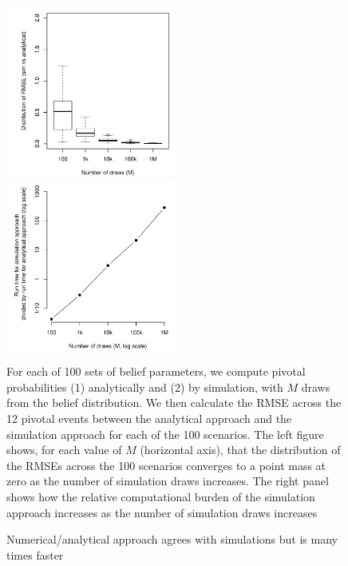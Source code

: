 \documentclass[11pt,a4paper]{article}
\begin{document}
\begin{figure}\caption{Numerical/analytical approach agrees with simulations but is many times faster \label{rmse_box}}
\begin{center}
\includegraphics[width=0.5\textwidth]{./../../output/figs/rmses/rmse_boxplots_by_number_of_simulations_no_trunc_dirichlet_v2_narrower.pdf}%
\includegraphics[width=0.5\textwidth]{./../../output/figs/rmses/time_required.pdf}
\end{center} 
\footnotesize{ For each of 100 sets of belief parameters, we compute pivotal probabilities (1) analytically and (2) by simulation, with $M$ draws from the belief distribution. We then calculate the RMSE across the 12 pivotal events between the analytical approach and the simulation approach for each of the 100 scenarios. The left figure shows, for each value of $M$ (horizontal axis), that the distribution of the RMSEs across the 100 scenarios converges to a point mass at zero as the number of simulation draws increases. The right panel shows how the relative computational burden of the simulation approach increases as the number of simulation draws increases} 
\end{figure}  
\end{document}
